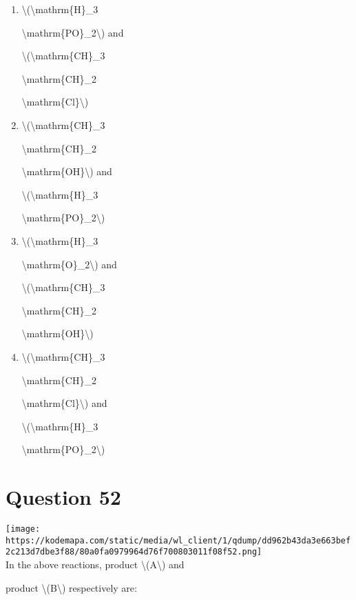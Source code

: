 \documentclass{article}
\begin{document}
\begin{enumerate}[label=(\alph*)]
\item \textbackslash(\textbackslash mathrm\{H\}\_3

\textbackslash mathrm\{PO\}\_2\textbackslash) and

\textbackslash(\textbackslash mathrm\{CH\}\_3

\textbackslash mathrm\{CH\}\_2

\textbackslash mathrm\{Cl\}\textbackslash)


\item \textbackslash(\textbackslash mathrm\{CH\}\_3

\textbackslash mathrm\{CH\}\_2

\textbackslash mathrm\{OH\}\textbackslash) and

\textbackslash(\textbackslash mathrm\{H\}\_3

\textbackslash mathrm\{PO\}\_2\textbackslash)


\item \textbackslash(\textbackslash mathrm\{H\}\_3

\textbackslash mathrm\{O\}\_2\textbackslash) and

\textbackslash(\textbackslash mathrm\{CH\}\_3

\textbackslash mathrm\{CH\}\_2

\textbackslash mathrm\{OH\}\textbackslash)


\item \textbackslash(\textbackslash mathrm\{CH\}\_3

\textbackslash mathrm\{CH\}\_2

\textbackslash mathrm\{Cl\}\textbackslash) and

\textbackslash(\textbackslash mathrm\{H\}\_3

\textbackslash mathrm\{PO\}\_2\textbackslash)


\end{enumerate}
\newpage
\section*{Question 52}
\texttt{[image: https://kodemapa.com/static/media/wl\_client/1/qdump/dd962b43da3e663bef2c213d7dbe3f88/80a0fa0979964d76f700803011f08f52.png]}\\



In the above reactions, product \textbackslash(A\textbackslash) and

product \textbackslash(B\textbackslash) respectively are:
\end{document}
